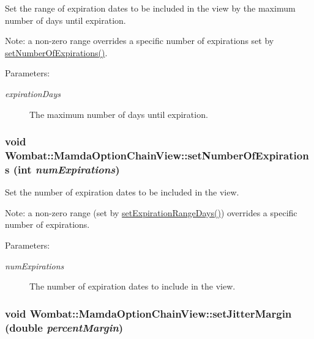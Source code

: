 Set the range of expiration dates to be included in the view by the maximum number of days until expiration. 

Note: a non-zero range overrides a specific number of expirations set by \hyperlink{classWombat_1_1MamdaOptionChainView_0fb174b905a2babf5fd0b92fb5a69650}{set\-Number\-Of\-Expirations()}.

\begin{Desc}
\item[Parameters:]
\begin{description}
\item[{\em expiration\-Days}]The maximum number of days until expiration. \end{description}
\end{Desc}
\hypertarget{classWombat_1_1MamdaOptionChainView_0fb174b905a2babf5fd0b92fb5a69650}{
\subsubsection[setNumberOfExpirations]{\setlength{\rightskip}{0pt plus 5cm}void Wombat::Mamda\-Option\-Chain\-View::set\-Number\-Of\-Expirations (int {\em num\-Expirations})}}
\label{classWombat_1_1MamdaOptionChainView_0fb174b905a2babf5fd0b92fb5a69650}


Set the number of expiration dates to be included in the view. 

Note: a non-zero range (set by \hyperlink{classWombat_1_1MamdaOptionChainView_2d8ab089e9fb64bed9a8a3be612ac618}{set\-Expiration\-Range\-Days()}) overrides a specific number of expirations.

\begin{Desc}
\item[Parameters:]
\begin{description}
\item[{\em num\-Expirations}]The number of expiration dates to include in the view. \end{description}
\end{Desc}
\hypertarget{classWombat_1_1MamdaOptionChainView_37549b6a122846ba40e229057f254e84}{
\subsubsection[setJitterMargin]{\setlength{\rightskip}{0pt plus 5cm}void Wombat::Mamda\-Option\-Chain\-View::set\-Jitter\-Margin (double {\em percent\-Margin})}}
\label{classWombat_1_1MamdaOptionChainView_37549b6a122846ba40e229057f254e84}


